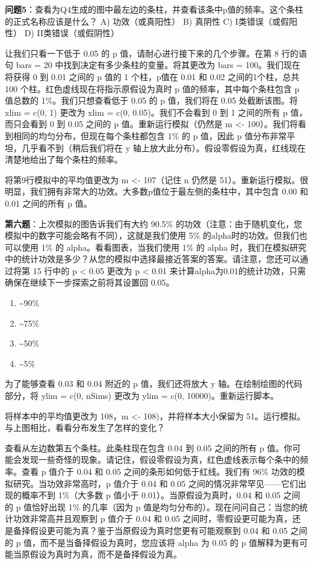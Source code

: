 \documentclass[
  letterpaper,
  DIV=11,
  numbers=noendperiod]{scrreprt}
\providecommand{\tightlist}{%
  \setlength{\itemsep}{0pt}\setlength{\parskip}{0pt}}\usepackage{longtable,booktabs,array}
\begin{document}
\textbf{问题5}：查看为Q4生成的图中最左边的条柱，并查看该条中p值的频率。这个条柱的正式名称应该是什么？
A) 功效（或真阳性） B) 真阴性 C) I类错误（或假阳性） D)
II类错误（或假阴性）

让我们只看一下低于 0.05 的 p 值，请耐心进行接下来的几个步骤。在第 8
行的语句 bars = 20 中找到决定有多少条柱的变量。将其更改为 bars =
100。我们现在将获得 0 到 0.01 之间的 p 值的 1 个柱，p值在 0.01 和 0.02
之间的1个柱，总共 100 个柱。红色虚线现在将指示原假设为真时 p
值的频率，其中每个条柱包含 p 值总数的 1\%。我们只想查看低于 0.05 的 p
值，我们将在 0.05 处截断该图。将 xlim = c(0, 1) 更改为 xlim = c(0,
0.05)。我们不会看到 0 到 1 之间的所有 p 值，而只会看到 0 到 0.05 之间的
p 值。重新运行模拟（仍然是 m \textless-
100）。我们将看到相同的均匀分布，但现在每个条柱都包含 1\% 的 p 值，因此
p 值分布非常平坦，几乎看不到（稍后我们将在 y
轴上放大此分布）。假设零假设为真，红线现在清楚地给出了每个条柱的频率。

将第9行模拟中的平均值更改为 m \textless- 107（记住 n 仍然是
51）。重新运行模拟。很明显，我们拥有非常大的功效。大多数p值位于最左侧的条柱中，其中包含
0.00 和 0.01 之间的所有 p 值。

\textbf{第六题}：上次模拟的图告诉我们有大约 90.5\%
的功效（注意：由于随机变化，您模拟中的数字可能会略有不同），这就是我们使用
5\% 的alpha时的功效。但我们也可以使用 1\% 的 alpha。看看图表，当我们使用
1\% 的 alpha
时，我们在模拟研究中的统计功效是多少？从您的模拟中选择最接近答案的答案。请注意，您还可以通过将第
15 行中的 p \textless{} 0.05 更改为 p \textless{} 0.01
来计算alpha为0.01的统计功效，只需确保在继续下一步探索之前将其设置回
0.05。

\begin{enumerate}
\def\labelenumi{\Alph{enumi})}
\tightlist
\item
  \textasciitilde90\%
\item
  \textasciitilde75\%
\item
  \textasciitilde50\%
\item
  \textasciitilde5\%
\end{enumerate}

为了能够查看 0.03 和 0.04 附近的 p 值，我们还将放大 y
轴。在绘制绘图的代码部分，将 ylim = c(0, nSims) 更改为 ylim = c(0,
10000)。重新运行脚本。

将样本中的平均值更改为 108，m \textless- 108)，并将样本大小保留为
51。运行模拟。与上图相比，看看分布发生了怎样的变化？

查看从左边数第五个条柱。此条柱现在包含 0.04 到 0.05 之间的所有 p
值。你可能会发现一些奇怪的现象。请记住，假设零假设为真，红色虚线表示每个条中的频率。查看
p 值介于 0.04 和 0.05 之间的条形如何低于红线。我们有 96\%
功效的模拟研究。当功效非常高时，p 值介于 0.04 和 0.05
之间的情况非常罕见------它们出现的概率不到 1\%（大多数 p 值小于
0.01）。当原假设为真时，0.04 和 0.05 之间的 p 值恰好出现 1\%
的几率（因为 p
值是均匀分布的）。现在问问自己：当您的统计功效非常高并且观察到 p 值介于
0.04 和 0.05
之间时，零假设更可能为真，还是备择假设更可能为真？鉴于当原假设为真时您更有可能观察到
0.04 和 0.05 之间的 p 值，而不是当备择假设为真时，您应该将 alpha 为 0.05
的 p 值解释为更有可能当原假设为真时为真，而不是备择假设为真。
\end{document}

